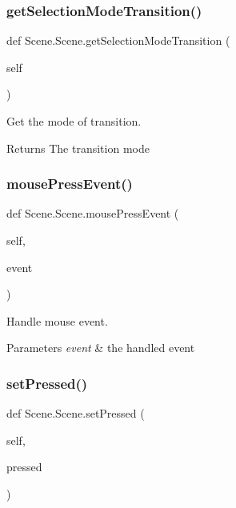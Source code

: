 \subsubsection{\texorpdfstring{getSelectionModeTransition()}{getSelectionModeTransition()}}
{\footnotesize\ttfamily def Scene.\+Scene.\+get\+Selection\+Mode\+Transition (\begin{DoxyParamCaption}\item[{}]{self }\end{DoxyParamCaption})}



Get the mode of transition. 

\begin{DoxyReturn}{Returns}
The transition mode 
\end{DoxyReturn}
\mbox{\label{classScene_1_1Scene_ae53ab48d140cdcf3e66d62419cababc8}} 
\subsubsection{\texorpdfstring{mousePressEvent()}{mousePressEvent()}}
{\footnotesize\ttfamily def Scene.\+Scene.\+mouse\+Press\+Event (\begin{DoxyParamCaption}\item[{}]{self,  }\item[{}]{event }\end{DoxyParamCaption})}



Handle mouse event. 


\begin{DoxyParams}{Parameters}
{\em event} & the handled event \\
\hline
\end{DoxyParams}
\mbox{\label{classScene_1_1Scene_a4441b549ee5f08e5f9bef1654798ec53}} 
\subsubsection{\texorpdfstring{setPressed()}{setPressed()}}
{\footnotesize\ttfamily def Scene.\+Scene.\+set\+Pressed (\begin{DoxyParamCaption}\item[{}]{self,  }\item[{}]{pressed }\end{DoxyParamCaption})}



